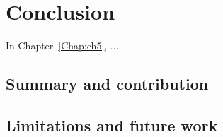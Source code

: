 \chapter[Conclusion]{Conclusion}
\label{Chap:Conclusion}
\pagestyle{headings}
In Chapter~\ref{Chap:ch5}, ...

\section{Summary and contribution}




\section{Limitations and future work}
